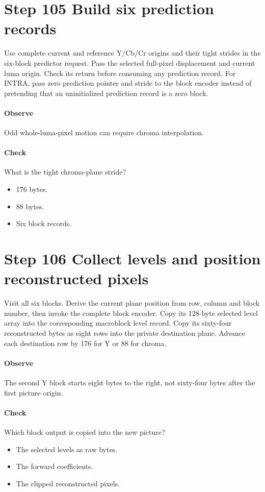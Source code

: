\section{Step 105 Build six prediction records}\label{h263-picture-s05}
Use complete current and reference Y/Cb/Cr origins and their tight strides in
the six-block predictor request. Pass the selected full-pixel displacement and
current luma origin. Check its return before consuming any prediction record.
For INTRA, pass zero prediction pointer and stride to the block encoder instead
of pretending that an uninitialized prediction record is a zero block.

\paragraph{Observe} Odd whole-luma-pixel motion can require chroma interpolation.
\paragraph{Check} What is the tight chroma-plane stride?
\begin{itemize}
  \item[A.] 176 bytes.
  \item[B.] 88 bytes.
  \item[C.] Six block records.
\end{itemize}

\section{Step 106 Collect levels and position reconstructed pixels}\label{h263-picture-s06}
Visit all six blocks. Derive the current plane position from row, column and
block number, then invoke the complete block encoder. Copy its 128-byte selected
level array into the corresponding macroblock level record. Copy its sixty-four
reconstructed bytes as eight rows into the private destination plane. Advance
each destination row by 176 for Y or 88 for chroma.

\paragraph{Observe} The second Y block starts eight bytes to the right, not sixty-four bytes after the first picture origin.
\paragraph{Check} Which block output is copied into the new picture?
\begin{itemize}
  \item[A.] The selected levels as raw bytes.
  \item[B.] The forward coefficients.
  \item[C.] The clipped reconstructed pixels.
\end{itemize}

